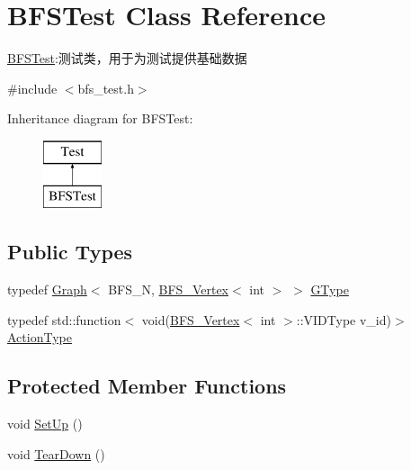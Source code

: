 \hypertarget{class_b_f_s_test}{}\section{B\+F\+S\+Test Class Reference}
\label{class_b_f_s_test}


\hyperlink{class_b_f_s_test}{B\+F\+S\+Test}\+:测试类，用于为测试提供基础数据  




{\ttfamily \#include $<$bfs\+\_\+test.\+h$>$}

Inheritance diagram for B\+F\+S\+Test\+:\begin{figure}[H]
\begin{center}
\leavevmode
\includegraphics[height=2.000000cm]{class_b_f_s_test}
\end{center}
\end{figure}
\subsection*{Public Types}
\begin{DoxyCompactItemize}
\item 
typedef \hyperlink{struct_introduction_to_algorithm_1_1_graph_algorithm_1_1_graph}{Graph}$<$ B\+F\+S\+\_\+\+N, \hyperlink{struct_introduction_to_algorithm_1_1_graph_algorithm_1_1_b_f_s___vertex}{B\+F\+S\+\_\+\+Vertex}$<$ int $>$ $>$ \hyperlink{class_b_f_s_test_ad38ca5029d5674d467dc71d13f5e5c7c}{G\+Type}
\item 
typedef std\+::function$<$ void(\hyperlink{struct_introduction_to_algorithm_1_1_graph_algorithm_1_1_b_f_s___vertex}{B\+F\+S\+\_\+\+Vertex}$<$ int $>$\+::V\+I\+D\+Type v\+\_\+id)$>$ \hyperlink{class_b_f_s_test_a4012e860a3e78030ef0f4f544a834177}{Action\+Type}
\end{DoxyCompactItemize}
\subsection*{Protected Member Functions}
\begin{DoxyCompactItemize}
\item 
void \hyperlink{class_b_f_s_test_a295164608e7887ea16383eb80e0d2a45}{Set\+Up} ()
\item 
void \hyperlink{class_b_f_s_test_ac160dd8773850140c50cde59c8498764}{Tear\+Down} ()
\end{DoxyCompactItemize}
